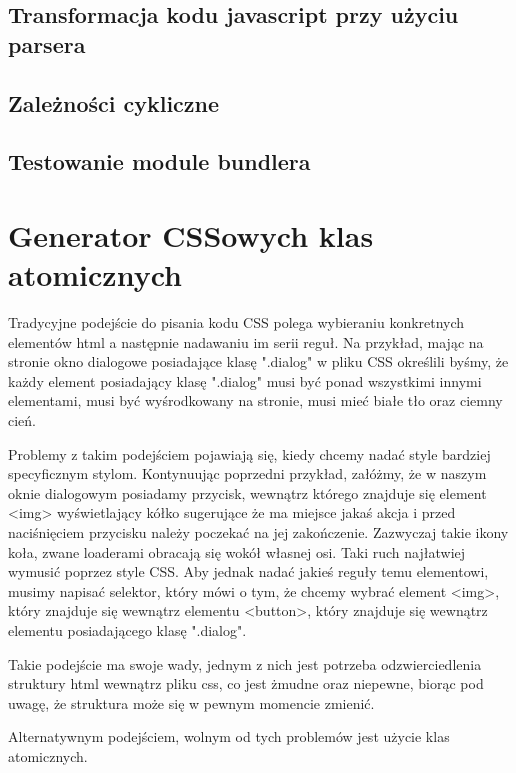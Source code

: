 \documentclass{SGGW-thesis}
\begin{document}
\section{Transformacja kodu javascript przy użyciu parsera}
\section{Zależności cykliczne}
\section{Testowanie module bundlera}

\chapter{Generator CSSowych klas atomicznych}
Tradycyjne podejście do pisania kodu CSS polega wybieraniu konkretnych elementów html a następnie nadawaniu im serii reguł. Na przykład, mając na stronie okno dialogowe posiadające klasę ".dialog" w pliku CSS określili byśmy, że każdy element posiadający klasę ".dialog" musi być ponad wszystkimi innymi elementami, musi być wyśrodkowany na stronie, musi mieć białe tło oraz ciemny cień.

Problemy z takim podejściem pojawiają się, kiedy chcemy nadać style bardziej specyficznym stylom. Kontynuując poprzedni przykład, załóżmy, że w naszym oknie dialogowym posiadamy przycisk, wewnątrz którego znajduje się element <img> wyświetlający kółko sugerujące że ma miejsce jakaś akcja i przed naciśnięciem przycisku należy poczekać na jej zakończenie. Zazwyczaj takie ikony koła, zwane loaderami obracają się wokół własnej osi. Taki ruch najłatwiej wymusić poprzez style CSS. Aby jednak nadać jakieś reguły temu elementowi, musimy napisać selektor, który mówi o tym, że chcemy wybrać element <img>, który znajduje się wewnątrz elementu <button>, który znajduje się wewnątrz elementu posiadającego klasę ".dialog".

Takie podejście ma swoje wady, jednym z nich jest potrzeba odzwierciedlenia struktury html wewnątrz pliku css, co jest żmudne oraz niepewne, biorąc pod uwagę, że struktura może się w pewnym momencie zmienić.

Alternatywnym podejściem, wolnym od tych problemów jest użycie klas atomicznych.
\end{document}
